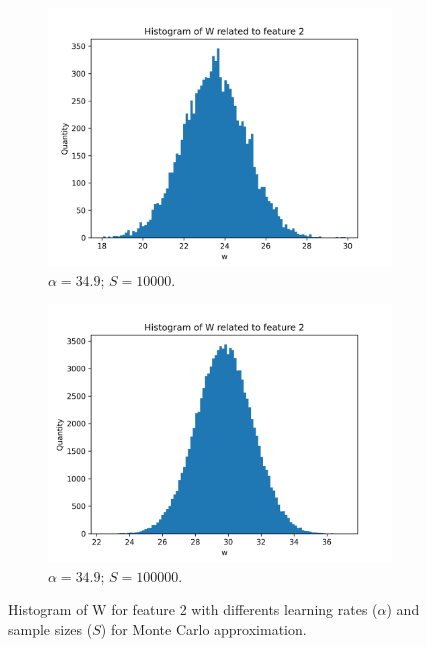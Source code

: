 \documentclass{article}
\begin{document}
\begin{figure}
\begin{subfigure}[t]{0.24\textwidth}
    \includegraphics[width=\linewidth]{hist_feat1_349000000_sample_10000.png}
    \caption{$\alpha = 34.9$; $S = 10000$.}
  \end{subfigure}
  \hfill
  \begin{subfigure}[t]{0.24\textwidth}
    \centering
    \includegraphics[width=\linewidth]{hist_feat1_349000000_sample_100000.png}
    \caption{$\alpha = 34.9$; $S = 100000$.}
  \end{subfigure}
  \caption{Histogram of W for feature 2 with differents learning rates ($\alpha$) and sample sizes ($S$) for Monte Carlo approximation.}
  \label{fig:hist_feat1}
\end{figure}
\end{document}
